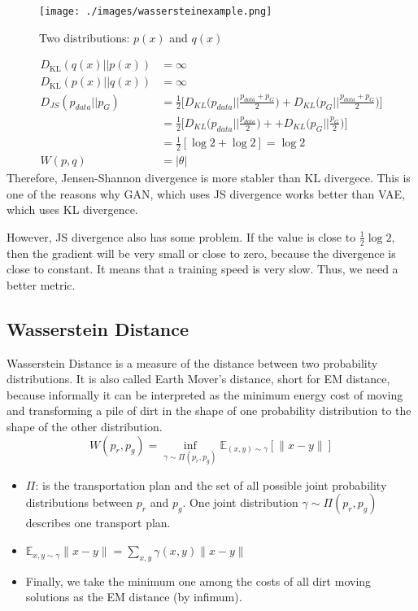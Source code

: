 \begin{figure}[h]
	\begin{center}
		\texttt{[image: ./images/wassersteinexample.png]}
	\end{center}
	\caption{Two distributions: $p(x)$ and $q(x)$}
	\label{fig:wassersteinexample}
\end{figure}

\begin{align*}
	D_\textrm{KL}(q(x)||p(x)) &= \infty\\
	D_\textrm{KL}(p(x)||q(x)) &= \infty\\
	D_{JS}(p_{data}||p_{G}) &= \frac{1}{2}\Bigg[D_{KL}\Big(p_{data}\Big|\Big|\frac{p_{data}+p_{G}}{2}\Big)+D_{KL}\Big(p_{G}\Big|\Big|\frac{p_{data}+p_{G}}{2}\Big)\Bigg]\\
	& = \frac{1}{2}\Bigg[D_{KL}\Big(p_{data}\Big|\Big|\frac{p_{data}}{2}\Big)++D_{KL}\Big(p_{G}\Big|\Big|\frac{p_{G}}{2}\Big)\Bigg]\\
	& = \frac{1}{2}[\log 2 + \log 2] = \log 2\\
	W(p,q) & = |\theta|
\end{align*}
Therefore, Jensen-Shannon divergence is more stabler than KL divergece. This is one of the reasons why GAN, which uses JS divergence works better than VAE, which uses KL divergence. 

However, JS divergence also has some problem. If the value is close to $\frac{1}{2}\log 2$, then the gradient will be very small or close to zero, because the divergence is close to constant. It means that a training speed is very slow. Thus, we need a better metric. 

\subsection{Wasserstein Distance}
Wasserstein Distance is a measure of the distance between two probability distributions. It is also called Earth Mover’s distance, short for EM distance, because informally it can be interpreted as the minimum energy cost of moving and transforming a pile of dirt in the shape of one probability distribution to the shape of the other distribution.
\begin{equation*}
	W(p_r, p_g) = \inf_{\gamma \sim \Pi(p_r, p_g)} \mathbb{E}_{(x, y) \sim \gamma}[\| x-y \|]
\end{equation*}

\begin{itemize}
	\item $\Pi$: is the transportation plan and the set of all possible joint probability distributions between $p_r$ and $p_g$. One joint distribution $\gamma \sim \Pi(p_r, p_g)$ describes one transport plan.\
	\item $\mathbb{E}_{x, y \sim \gamma} \| x-y \| = \sum_{x, y} \gamma(x, y) \| x-y \|$
	\item Finally, we take the minimum one among the costs of all dirt moving solutions as the EM distance (by infimum). 
\end{itemize}


